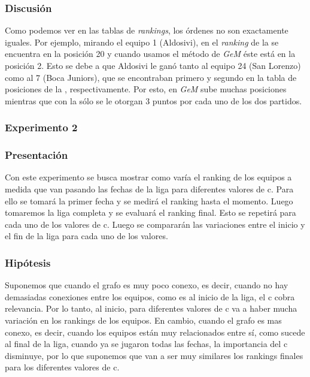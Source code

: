 			\subsubsection*{Discusión}


			Como podemos ver en las tablas de \emph{rankings}, los órdenes no son exactamente iguales. Por ejemplo, mirando el equipo 1 (Aldosivi), en el \emph{ranking} de la  se encuentra en la posición 20 y cuando usamos el método de \emph{GeM} éste está en la posición 2. Esto se debe a que Aldosivi le ganó tanto al equipo 24 (San Lorenzo) como al 7 (Boca Juniors), que se encontraban primero y segundo en la tabla de posiciones de la , respectivamente. Por esto, en \emph{GeM} sube muchas posiciones mientras que con la  sólo se le otorgan 3 puntos por cada uno de los dos partidos.



        \subsubsection{Experimento 2}
        \subsubsection*{Presentación}
        Con este experimento se busca mostrar como varía el ranking de los equipos a medida que van pasando las fechas de la liga para diferentes valores de c. Para ello se tomará la primer fecha y se medirá el ranking hasta el momento. Luego tomaremos la liga completa y se evaluará el ranking final. Esto se repetirá para cada uno de los valores de c. Luego se compararán las variaciones entre el inicio y el fin de la liga para cada uno de los valores. 

            \subsubsection*{Hipótesis} 
            Suponemos que cuando el grafo es muy poco conexo, es decir, cuando no hay demasiadas conexiones entre los equipos, como es al inicio de la liga, el c cobra relevancia. Por lo tanto, al inicio, para diferentes valores de c va a haber mucha variación en los rankings de los equipos. En cambio, cuando el grafo es mas conexo, es decir, cuando los equipos están muy relacionados entre sí, como sucede al final de la liga, cuando ya se jugaron todas las fechas, la importancia del c disminuye, por lo que suponemos que van a ser muy similares los rankings finales para los diferentes valores de c.  

